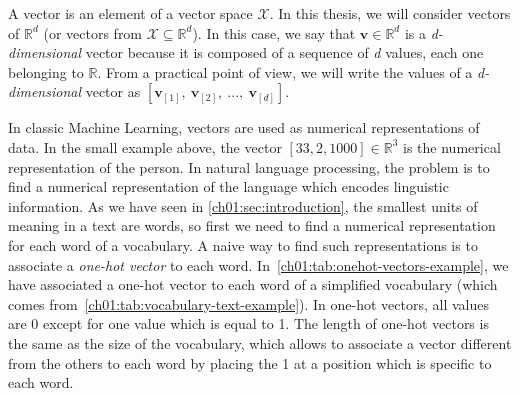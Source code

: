   \theoremstyle{definition}
  \begin{definition}[A vector]
    \label{ch01:def:def-vector}
    A vector is an element of a vector space $\mathcal{X}$. In this thesis, we
    will consider vectors of $\mathbb{R}^d$ (or vectors from $\mathcal{X}
    \subseteq \mathbb{R}^d$). In this case, we say that $\mathbf{v} \in
    \mathbb{R}^d$ is a \textit{d-dimensional} vector because it is composed of a
    sequence of \textit{d} values, each one belonging to $\mathbb{R}$. From a
    practical point of view, we will write the values of a
    \textit{d-dimensional} vector as $[\mathbf{v}_{[1]},~\mathbf{v}_{[2]},~...,
    ~\mathbf{v}_{[d]}]$.
  \end{definition}

  In classic Machine Learning, vectors are used as numerical representations of
  data. In the small example above, the vector $[33, 2, 1000] \in \mathbb{R}^3$
  is the numerical representation of the person. In natural language processing,
  the problem is to find a numerical representation of the language which
  encodes linguistic information. As we have seen in
  \autoref{ch01:sec:introduction}, the smallest units of meaning in a text are
  words, so first we need to find a numerical representation for each word of a
  vocabulary. A naive way to find such representations is to associate a
  \textit{one-hot vector} to each word.
  In~\autoref{ch01:tab:onehot-vectors-example}, we have associated a one-hot
  vector to each word of a simplified vocabulary (which comes
  from~\autoref{ch01:tab:vocabulary-text-example}). In one-hot vectors, all
  values are 0 except for one value which is equal to 1. The length of one-hot
  vectors is the same as the size of the vocabulary, which allows to associate a
  vector different from the others to each word by placing the 1 at a position
  which is specific to each word.\medbreak

